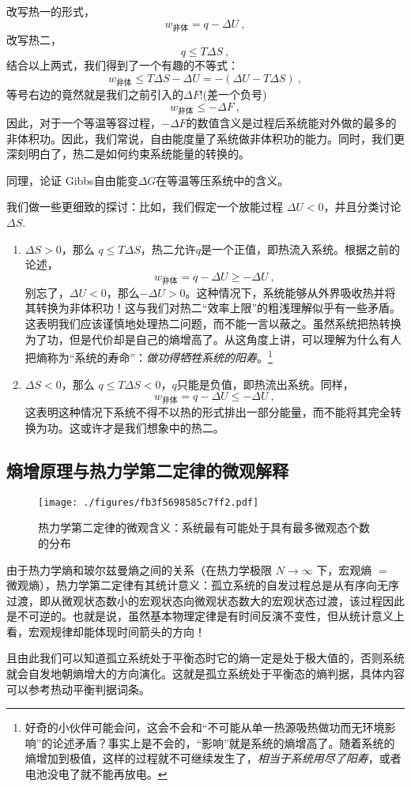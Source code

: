 改写热一的形式，
$$
w_\text{非体} = q - \Delta U
~,
$$
改写热二，
$$
q \le T\Delta S
~,
$$
结合以上两式，我们得到了一个有趣的不等式：
$$
w_\text{非体} \le T \Delta S - \Delta U = - (\Delta U-T \Delta S ) ~,
$$
等号右边的竟然就是我们之前引入的$\Delta F$!(差一个负号) 
\begin{equation}
w_\text{非体} \le - \Delta F~,
\end{equation}
因此，对于一个等温等容过程，$-\Delta F$的数值含义是过程后系统能对外做的最多的非体积功。因此，我们常说，自由能度量了系统做非体积功的能力。同时，我们更深刻明白了，热二是如何约束系统能量的转换的。

\begin{exercise}{}
同理，论证 Gibbs自由能变$\Delta G$在等温等压系统中的含义。
\end{exercise}

我们做一些更细致的探讨：比如，我们假定一个放能过程 $\Delta U < 0$，并且分类讨论 $\Delta S$.
\begin{enumerate}
\item $\Delta S > 0$，那么 $q \le T\Delta S$，热二允许$q$是一个正值，即热流入系统。根据之前的论述，
$$
w_\text{非体} = q - \Delta U \ge - \Delta U 
~,
$$
别忘了，$\Delta U<0$，那么$-\Delta U>0$。这种情况下，系统能够从外界吸收热并将其转换为非体积功！这与我们对热二“效率上限”的粗浅理解似乎有一些矛盾。这表明我们应该谨慎地处理热二问题，而不能一言以蔽之。虽然系统把热转换为了功，但是代价却是自己的熵增高了。从这角度上讲，可以理解为什么有人把熵称为“系统的寿命”：\textsl{做功得牺牲系统的阳寿}。\footnote{好奇的小伙伴可能会问，这会不会和“不可能从单一热源吸热做功而无环境影响”的论述矛盾？事实上是不会的，“影响”就是系统的熵增高了。随着系统的熵增加到极值，这样的过程就不可继续发生了，\textsl{相当于系统用尽了阳寿}，或者电池没电了就不能再放电。}
\item $\Delta S < 0$，那么 $q \le T\Delta S < 0$，$q$只能是负值，即热流出系统。同样，
$$
w_\text{非体} = q - \Delta U \le - \Delta U 
~,
$$
这表明这种情况下系统不得不以热的形式排出一部分能量，而不能将其完全转换为功。这或许才是我们想象中的热二。
\end{enumerate}


\subsection{熵增原理与热力学第二定律的微观解释}
\begin{figure}[ht]
\centering
\texttt{[image: ./figures/fb3f5698585c7ff2.pdf]}
\caption{热力学第二定律的微观含义：系统最有可能处于具有最多微观态个数的分布} \label{fig_Td2Law_4}
\end{figure}
由于热力学熵和玻尔兹曼熵之间的关系（在热力学极限 $N\rightarrow \infty$ 下，宏观熵 $=$ 微观熵），热力学第二定律有其统计意义：孤立系统的自发过程总是从有序向无序过渡，即从微观状态数小的宏观状态向微观状态数大的宏观状态过渡，该过程因此是不可逆的。也就是说，虽然基本物理定律是有时间反演不变性，但从统计意义上看，宏观规律却能体现时间箭头的方向！

且由此我们可以知道孤立系统处于平衡态时它的熵一定是处于极大值的，否则系统就会自发地朝熵增大的方向演化。这就是孤立系统处于平衡态的熵判据，具体内容可以参考热动平衡判据词条。
